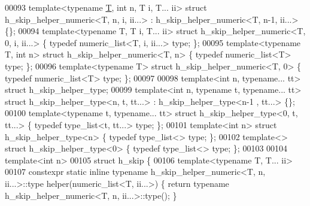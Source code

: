 \begin{DoxyCode}
00093 \textcolor{keyword}{template}<\textcolor{keyword}{typename} \hyperlink{group___sparse_core___module_class_eigen_1_1_triplet}{T}, \textcolor{keywordtype}{int} n, T i, T... ii> \textcolor{keyword}{struct }h\_skip\_helper\_numeric<T, n, i, ii...> : 
      h\_skip\_helper\_numeric<T, n-1, ii...> \{\};
00094 \textcolor{keyword}{template}<\textcolor{keyword}{typename} T, T i, T... ii>        \textcolor{keyword}{struct }h\_skip\_helper\_numeric<T, 0, i, ii...> \{ \textcolor{keyword}{typedef} 
      numeric\_list<T, i, ii...> type; \};
00095 \textcolor{keyword}{template}<\textcolor{keyword}{typename} T, \textcolor{keywordtype}{int} n>               \textcolor{keyword}{struct }h\_skip\_helper\_numeric<T, n>           \{ \textcolor{keyword}{typedef} 
      numeric\_list<T> type; \};
00096 \textcolor{keyword}{template}<\textcolor{keyword}{typename} T>                      \textcolor{keyword}{struct }h\_skip\_helper\_numeric<T, 0>           \{ \textcolor{keyword}{typedef} 
      numeric\_list<T> type; \};
00097 
00098 \textcolor{keyword}{template}<\textcolor{keywordtype}{int} n, \textcolor{keyword}{typename}... tt>             \textcolor{keyword}{struct }h\_skip\_helper\_type;
00099 \textcolor{keyword}{template}<\textcolor{keywordtype}{int} n, \textcolor{keyword}{typename} t, \textcolor{keyword}{typename}... tt> \textcolor{keyword}{struct }h\_skip\_helper\_type<n, t, tt...> : h\_skip\_helper\_type<n-1
      , tt...> \{\};
00100 \textcolor{keyword}{template}<\textcolor{keyword}{typename} t, \textcolor{keyword}{typename}... tt>        \textcolor{keyword}{struct }h\_skip\_helper\_type<0, t, tt...> \{ \textcolor{keyword}{typedef} type\_list<t, 
      tt...> type; \};
00101 \textcolor{keyword}{template}<\textcolor{keywordtype}{int} n>                             \textcolor{keyword}{struct }h\_skip\_helper\_type<n>           \{ \textcolor{keyword}{typedef} type\_list<> 
      type; \};
00102 \textcolor{keyword}{template}<>                                  \textcolor{keyword}{struct }h\_skip\_helper\_type<0>           \{ \textcolor{keyword}{typedef} type\_list<> 
      type; \};
00103 
00104 \textcolor{keyword}{template}<\textcolor{keywordtype}{int} n>
00105 \textcolor{keyword}{struct }h\_skip \{
00106   \textcolor{keyword}{template}<\textcolor{keyword}{typename} T, T... ii>
00107   constexpr \textcolor{keyword}{static} \textcolor{keyword}{inline} \textcolor{keyword}{typename} h\_skip\_helper\_numeric<T, n, ii...>::type helper(numeric\_list<T, ii...>) 
      \{ \textcolor{keywordflow}{return} \textcolor{keyword}{typename} h\_skip\_helper\_numeric<T, n, ii...>::type(); \}

\end{DoxyCode}
